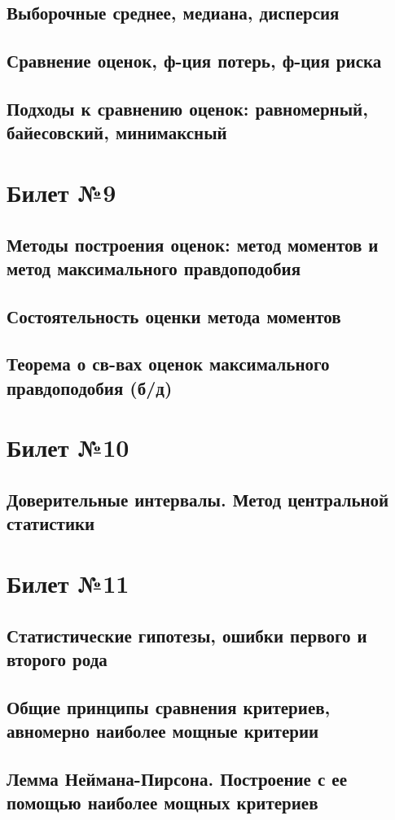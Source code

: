 \documentclass[a4paper]{article}
\begin{document}
\subsection{Выборочные среднее, медиана, дисперсия}
\subsection{Сравнение оценок, ф-ция потерь, ф-ция риска}
\subsection{Подходы к сравнению оценок: равномерный, байесовский, минимаксный}

\section{Билет №9}
\subsection{Методы построения оценок: метод моментов и метод максимального правдоподобия}
\subsection{Состоятельность оценки метода моментов}
\subsection{Теорема о св-вах оценок максимального правдоподобия (б/д)}

\section{Билет №10}
\subsection{Доверительные интервалы. Метод центральной статистики}

\section{Билет №11}
\subsection{Статистические гипотезы, ошибки первого и второго рода}
\subsection{Общие принципы сравнения критериев, авномерно наиболее мощные критерии}
\subsection{Лемма Неймана-Пирсона. Построение с ее помощью наиболее мощных критериев}
\end{document}
